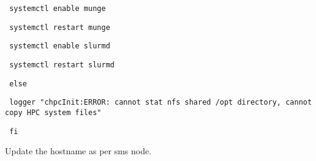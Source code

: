 \begin{section}
\begin{bash}\texttt{\small{     systemctl enable munge}}\end{bash}
\begin{bash}\texttt{\small{     systemctl restart munge}}\end{bash}
\begin{bash}\texttt{\small{     systemctl enable slurmd}}\end{bash}
\begin{bash}\texttt{\small{     systemctl restart slurmd}}\end{bash}
\begin{bash}\texttt{\small{ else}}\end{bash}
\begin{bash}\texttt{\small{     logger "chpcInit:ERROR: cannot stat nfs shared /opt directory, cannot copy HPC system files"}}\end{bash}
\begin{bash}\texttt{\small{ fi}}\end{bash}

Update the hostname as per sms node.


\end{section}
